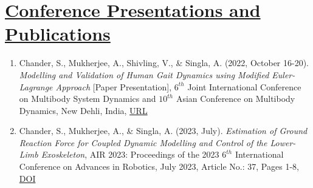 \section{\underline{Conference Presentations and Publications}}
\begin{enumerate}
\item Chander, S., Mukherjee, A., Shivling, V., \& Singla, A. (2022, October 16-20). \emph{Modelling and Validation of Human Gait Dynamics using Modified Euler-Lagrange Approach} [Paper Presentation], $6^{th}$ Joint International Conference on Multibody System Dynamics and $10^{th}$ Asian Conference on Multibody Dynamics, New Dehli, India, \href{http://imsdacmd2020.iitd.ac.in/web-abstracts/pdf/WEB_ABSTRACTS/IMSDACMD2020_219.pdf}{\large{URL}}\\
\item Chander, S., Mukherjee, A., \& Singla, A. (2023, July). \emph{Estimation of Ground Reaction Force for Coupled Dynamic Modelling and Control of the Lower-Limb Exoskeleton}, AIR 2023: Proceedings of the 2023 $6^{th}$ International Conference on Advances in Robotics, July 2023, Article No.: 37, Pages 1-8, \href{https://doi.org/10.1145/3610419.3610456  }{\large{DOI}}
\end{enumerate}
